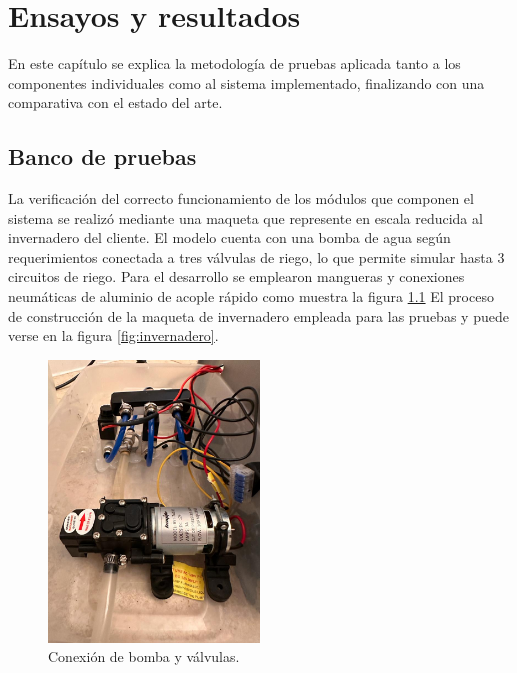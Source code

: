 
\chapter{Ensayos y resultados} %

\label{Chapter4} %

En este capítulo se explica la metodología de pruebas aplicada tanto a los componentes individuales como al sistema implementado, finalizando con una comparativa con el estado del arte.


\section{Banco de pruebas}
\label{sec:Banco de pruebas}

La verificación del correcto funcionamiento de los módulos que componen el sistema se realizó mediante una maqueta que represente en escala reducida al invernadero del cliente.
El modelo cuenta con una bomba de agua según requerimientos conectada a  tres válvulas de riego, lo que permite simular hasta 3 circuitos de riego.
Para el desarrollo se emplearon mangueras y conexiones neumáticas de aluminio de acople rápido como muestra la figura \ref{fig:pump}   
El proceso de construcción de la maqueta de invernadero empleada para las pruebas y puede verse en la figura \ref{fig:invernadero}.


\begin{figure}[h]
	\centering
	\includegraphics[width=0.5\textwidth]{./Figures/chapter4/pump_2.jpg}
	\caption[Conexión de bomba y válvulas]{Conexión de bomba y válvulas.}
	\label{fig:pump}
\end{figure}

